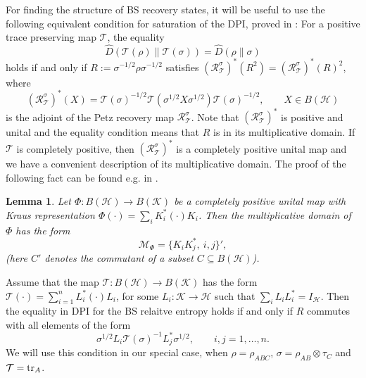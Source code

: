 \documentclass[11pt]{article}
\theoremstyle{newdefinition}
\theoremstyle{newplain}
\newtheorem{lemma}[definition]{Lemma}
\theoremstyle{myplain}
\DeclareMathOperator{\1}{\mathds{1}}
\begin{document}
{\color{magenta} 
For finding the structure of BS recovery states, it will be useful to use the following equivalent  condition for
saturation of the DPI, proved in  \cite[Thm. 3.34(h)]{HiaiMosonyi-f-divergences-2017}: For a positive
trace preserving map $\mathcal {T}$, the equality
\[
\hat D(\mathcal {T}(\rho)\|\mathcal {T}(\sigma))=\hat D(\rho\|\sigma)
\]
holds if and only if $R:=\sigma^{-1/2}\rho\sigma^{-1/2}$ satisfies
$(\mathcal{R}_{\mathcal {T}}^\sigma)^*(R^2)=(\mathcal {R}_{\mathcal {T}}^\sigma)^*(R)^2$, where
\[
(\mathcal{R}_{\mathcal {T}}^\sigma)^*(X)=\mathcal {T}(\sigma)^{-1/2}\mathcal
{T}(\sigma^{1/2}X\sigma^{1/2})\mathcal {T}(\sigma)^{-1/2},\qquad
X\in B(\mathcal {H})
\]
is the adjoint of the Petz recovery map $\mathcal {R}_{\mathcal T}^\sigma$.  Note that
$(\mathcal {R}_{\mathcal T}^\sigma)^*$ is  positive
and unital and the equality condition means that $R$ is in its multiplicative domain. If
$\mathcal {T}$ is completely positive, then $(\mathcal {R}_{\mathcal T}^\sigma)^*$ is a
completely positive unital map and we have a convenient description of its multiplicative
domain. The proof of the following fact can be found e.g. in \cite[Proposition 2]{carbone2020}.

\begin{lemma}\label{lemma:multiplicative} Let $\Phi:B(\mathcal {H})\to B(\mathcal {K})$ be a completely positive unital map with Kraus
representation $\Phi(\cdot)=\sum_i K_i^* (\cdot) K_i$. Then the multiplicative domain of
$\Phi$ has the form
\[
\mathcal {M}_\Phi=\{K_iK_j^*,\ i,j\}',
\]
(here $C'$ denotes the commutant of a subset $C\subseteq B(\mathcal {H})$).
\end{lemma}

Assume that the map $\mathcal {T}: B(\mathcal {H})\to B(\mathcal {K})$ has the form
$\mathcal {T}(\cdot)=\sum_{i=1}^n L_i^*(\cdot)L_i$, for some $L_i:\mathcal {K}\to \mathcal
{H}$ such that
$\sum_iL_iL_i^*=I_{\mathcal {H}}$. Then the equality in DPI for the BS relaitve entropy holds if and only if $R$ commutes
with all elements of the form 
\[
\sigma^{1/2}L_i\mathcal {T}(\sigma)^{-1}L_j^*\sigma^{1/2},\qquad i,j=1,\dots,n.
\]
We will use this condition in our special case, when $\rho=\rho_{ABC}$, $\sigma=\rho_{AB}\otimes
\tau_C$ and $\mathcal {T}=\tr_A$.





}
\end{document}
